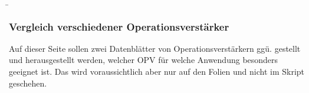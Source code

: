 \begin{frame}
	\b{\frametitle{Vergleich verschiedener Operationsverstärker}
    Auf dieser Seite sollen zwei Datenblätter von Operationsverstärkern ggü. gestellt und herausgestellt werden, welcher OPV für welche Anwendung besonders geeignet ist. 
    Das wird voraussichtlich aber nur auf den Folien und nicht im Skript geschehen.
    }
\end{frame}
